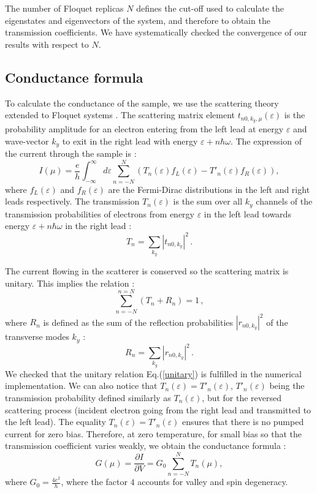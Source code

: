\documentclass[aps,prb,showpacs,superscriptaddress,twocolumn,10pt,floatfix]{revtex4-1}
\newcommand{\ep}{\varepsilon}
\begin{document}
The number of Floquet replicas $N$ defines the cut-off used to calculate the eigenstates and eigenvectors of the system, and therefore to obtain the transmission coefficients. We have systematically checked the convergence of our results with respect to $N$. 

\subsection{Conductance formula}

To calculate the conductance of the sample, we use the scattering theory extended to Floquet systems \cite{Moskalets2002}. The scattering matrix element $t_{n0,k_y,\mu}(\ep)$ is the probability amplitude for an electron entering from the left lead at energy $\ep$ and wave-vector $k_y$ to exit in the right lead with energy $\ep+n\hbar\omega$. The expression of the current through the sample is \cite{Moskalets2002,Kohler2005} :
\begin{equation}
I(\mu)=\frac{e}{h}\int_{-\infty}^{\infty}d\ep \sum_{n=-N}^N \left(T_n(\ep) f_L(\ep) - T'_n(\ep) f_R(\ep) \right),
\end{equation}
where $f_L(\ep)$ and $f_R(\ep)$ are the Fermi-Dirac distributions in the left and right leads respectively. The transmission $T_n(\ep)$ is the sum over all $k_y$ channels of the transmission probabilities of electrons from energy $\ep$ in the left lead towards energy  $\ep+n\hbar\omega$ in the right lead :
\begin{equation}
T_n=\sum_{k_y}|t_{n0,k_y}|^2 \, .
\end{equation}


The current flowing in the scatterer is conserved so the scattering matrix is unitary. This implies the relation :
\begin{equation}
\sum_{n=-N}^{n=N} \left(  T_n+R_n \right) = 1 \, ,
\label{unitary}
\end{equation}
where $R_n$ is defined as the sum of the reflection probabilities $|r_{n0,k_y}|^2$ of the transverse modes $k_y$ :
\begin{equation}
R_n=\sum_{k_y}|r_{n0,k_y}|^2 \,.
\end{equation}
We checked that the unitary relation Eq.(\ref{unitary}) is fulfilled in the numerical implementation. We can also notice that $T_n(\ep)=T'_n(\ep)$, $T'_n(\ep)$ being the transmission probability defined similarly as $T_n(\ep)$, but for the reversed scattering process (incident electron going from the right lead and transmitted to the left lead). The equality $T_n(\ep)=T'_n(\ep)$ ensures that there is no pumped current for zero bias. Therefore, at zero temperature, for small bias so that the transmission coefficient varies weakly, we obtain the conductance formula :
\begin{equation}
G(\mu)=\frac{\partial I}{\partial V}=G_0 \sum_{n=-N}^NT_n(\mu),
\label{eq:conductance}
\end{equation}
where $G_0=\frac{4e^2}{h}$, where the factor $4$ accounts for valley and spin degeneracy.
\end{document}

